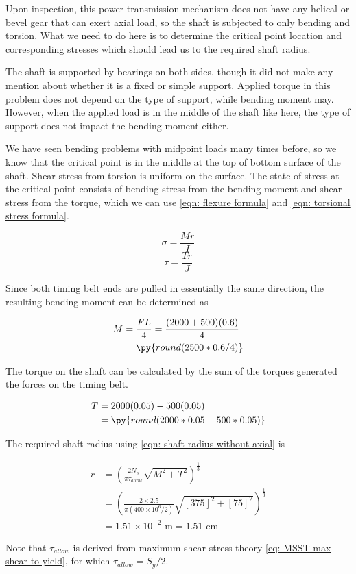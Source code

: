 \documentclass[
10pt,
a4paper,
openany,
svgnames,
]{book}
\begin{document}
\begin{solution}
  Upon inspection, this power transmission mechanism does not have any helical or bevel gear that can exert axial load, so the shaft is subjected to only bending and torsion. What we need to do here is to determine the critical point location and corresponding stresses which should lead us to the required shaft radius.

  The shaft is supported by bearings on both sides, though it did not make any mention about whether it is a fixed or simple support. Applied torque in this problem does not depend on the type of support, while bending moment may. However, when the applied load is in the middle of the shaft like here, the type of support does not impact the bending moment either.

  We have seen bending problems with midpoint loads many times before, so we know that the critical point is in the middle at the top of bottom surface of the shaft. Shear stress from torsion is uniform on the surface. The state of stress at the critical point consists of bending stress from the bending moment and shear stress from the torque, which we can use \cref{eqn: flexure formula} and \cref{eqn: torsional stress formula}. 

  $$ \sigma = \frac{Mr}{I} $$
  $$ \tau = \frac{Tr}{J} $$

  Since both timing belt ends are pulled in essentially the same direction, the resulting bending moment can be determined as

  \begin{align*}
    M &= \frac{FL}{4} = \frac{(2000 + 500)(0.6)}{4} \\
      &= \py{round(2500*0.6/4)}
  \end{align*}
  
  The torque on the shaft can be calculated by the sum of the torques generated the forces on the timing belt.

  \begin{align*}
    T &= 2000(0.05) - 500(0.05) \\
      &= \py{round(2000*0.05 - 500*0.05)}
  \end{align*}

  The required shaft radius using \cref{eqn: shaft radius without axial} is

  \begin{align*}
    r &= \left( \frac{2 N_s}{\pi \tau _{allow}}\sqrt {M^2 +T^2}  \right)^{\frac{1}{3}} \\
      &= \left( \frac{2 \times 2.5}{\pi (400 \times 10^6 /2 )}\sqrt {[375]^2 +[75]^2}  \right)^{\frac{1}{3}} \\
      &= 1.51 \times 10^{-2} \text{ m} = 1.51 \text{ cm}
  \end{align*}

  Note that $\tau_{allow}$ is derived from maximum shear stress theory \cref{eq: MSST max shear to yield}, for which $\tau_{allow} = S_y/2$.
\end{solution}
\end{document}
